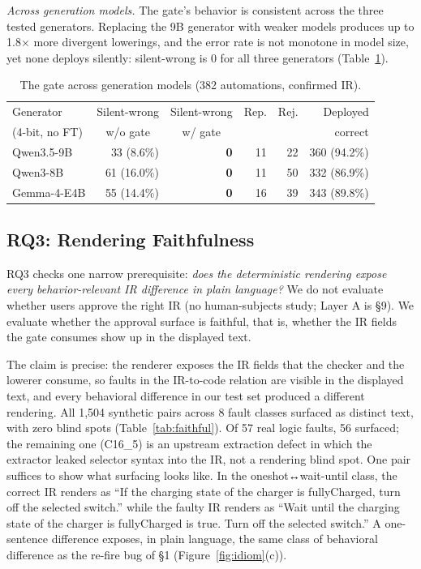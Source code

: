 \documentclass[sigconf,nonacm,anonymous,review]{acmart}
\begin{document}
\emph{Across generation models.} The gate's behavior is consistent across the three tested generators. Replacing the 9B generator with weaker models produces up to 1.8$\times$ more divergent lowerings, and the error rate is not monotone in model size, yet none deploys silently: silent-wrong is 0 for all three generators (Table~\ref{tab:models}).

\begin{table}[t]
\centering
\caption{The gate across generation models (382 automations, confirmed IR).}
\label{tab:models}
\small
\setlength{\tabcolsep}{3pt}
\begin{tabular}{lrrrrr}
\toprule
Generator & \multicolumn{1}{c}{Silent-wrong} & \multicolumn{1}{c}{Silent-wrong} & Rep. & Rej. & Deployed \\
(4-bit, no FT) & \multicolumn{1}{c}{w/o gate} & \multicolumn{1}{c}{w/ gate} & & & correct \\
\midrule
Qwen3.5-9B  & 33 (8.6\%)  & \textbf{0} & 11 & 22 & 360 (94.2\%) \\
Qwen3-8B    & 61 (16.0\%) & \textbf{0} & 11 & 50 & 332 (86.9\%) \\
Gemma-4-E4B & 55 (14.4\%) & \textbf{0} & 16 & 39 & 343 (89.8\%) \\
\bottomrule
\end{tabular}
\end{table}

\subsection{RQ3: Rendering Faithfulness}

RQ3 checks one narrow prerequisite: \emph{does the deterministic rendering expose every behavior-relevant IR difference in plain language?} We do not evaluate whether users approve the right IR (no human-subjects study; Layer A is \S9). We evaluate whether the approval surface is faithful, that is, whether the IR fields the gate consumes show up in the displayed text.

The claim is precise: the renderer exposes the IR fields that the checker and the lowerer consume, so faults in the IR-to-code relation are visible in the displayed text, and every behavioral difference in our test set produced a different rendering. All 1,504 synthetic pairs across 8 fault classes surfaced as distinct text, with zero blind spots (Table~\ref{tab:faithful}). Of 57 real logic faults, 56 surfaced; the remaining one (C16\_5) is an upstream extraction defect in which the extractor leaked selector syntax into the IR, not a rendering blind spot. One pair suffices to show what surfacing looks like. In the oneshot↔wait-until class, the correct IR renders as ``If the charging state of the charger is fullyCharged, turn off the selected switch.'' while the faulty IR renders as ``Wait until the charging state of the charger is fullyCharged is true. Turn off the selected switch.'' A one-sentence difference exposes, in plain language, the same class of behavioral difference as the re-fire bug of \S1 (Figure~\ref{fig:idiom}(c)).
\end{document}

